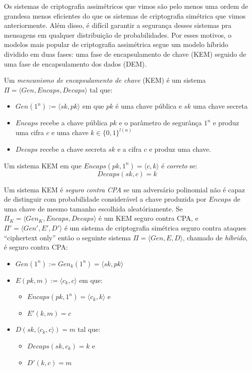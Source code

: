 Os sistemas de criptografia assimétricos que vimos são pelo menos uma ordem de grandesa menos eficientes do que os sistemas de criptografia simétrica que vimos anteriormente.
Além disso, é difícil garantir a segurança desses sistemas pra mensagens em qualquer distribuição de probabilidades.
Por esses motivos, o modelos mais popular de criptografia assimétrica segue um modelo híbrido dividido em duas fases: uma fase de encapsulamento de chave (KEM) seguido de uma fase de encapsulamento dos dados (DEM).

Um {\em mencanismo de encapsulamento de chave} (KEM) é um sistema $\Pi = \langle Gen, Encaps, Decaps \rangle$ tal que:
\begin{itemize}
\item $Gen(1^n) := \langle sk, pk \rangle$ em que $pk$ é uma chave pública e $sk$ uma chave secreta
\item $Encaps$ recebe a chave pública $pk$ e o parâmetro de segurânça $1^n$ e produz uma cifra $c$ e uma chave $k \in \{0,1\}^{l(n)}$
\item $Decaps$ recebe a chave secreta $sk$ e a cifra $c$ e produz uma chave.
\end{itemize}
 
Um sistema KEM em que $Encaps(pk, 1^n) = \langle c, k \rangle$ é {\em correto} se:
\begin{displaymath}
  Decaps(sk, c) =  k
\end{displaymath}

Um sistema KEM é {\em seguro contra CPA} se um adversário polinomial não é capaz de distinguir com probabilidade considerável a chave produzida por $Encaps$ de uma chave de mesmo tamanho escolhida aleatóriamente.
Se $\Pi_K = \langle Gen_K, Encaps, Decaps \rangle$ é um KEM seguro contra CPA, e $\Pi' = \langle Gen', E', D' \rangle$ é um sistema de criptografia simétrica seguro contra ataques ``ciphertext only'' então o seguinte sistema $\Pi = \langle Gen, E, D \rangle$, chamado de {\em híbrido}, é seguro contra CPA:

\begin{itemize}
\item $Gen(1^n) := Gen_k(1^n) = \langle sk, pk \rangle$
\item $E(pk, m) := \langle c_k, c \rangle$ em que: 
\begin{itemize}
\item $Encaps(pk, 1^n) = \langle c_k, k \rangle$ e
\item $E'(k, m) = c$
\end{itemize}
\item $D(sk,\langle c_k, c \rangle) = m$ tal que:
\begin{itemize}
\item $Decaps(sk, c_k) = k$ e
\item $D'(k, c) = m$
\end{itemize}
\end{itemize}

